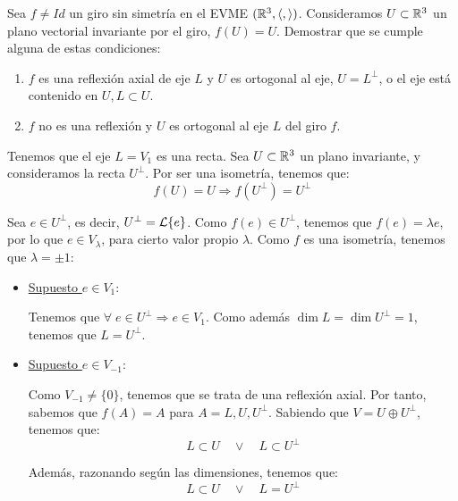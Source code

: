 \begin{ejercicio}
    Sea $f\neq Id$ un giro sin simetría en el EVME $(\mathbb{R}^3, \langle,\rangle)$. Consideramos $U\subset \mathbb{R}^3$ un plano vectorial invariante por el giro, $f(U) = U$. Demostrar que se cumple alguna de estas condiciones:
    \begin{enumerate}
        \item $f$ es una reflexión axial de eje $L$ y $U$ es ortogonal al eje, $U = L^\perp$, o el eje está contenido en $U, L \subset U$.

        \item $f$ no es una reflexión y $U$ es ortogonal al eje $L$ del giro $f$.
    \end{enumerate}


    Tenemos que el eje $L=V_1$ es una recta. Sea $U\subset \mathbb{R}^3$ un plano invariante, y consideramos la recta $U^\perp$. Por ser una isometría, tenemos que:
    \begin{equation*}
        f(U)=U\Longrightarrow f(U^\perp) = U^\perp
    \end{equation*}

    Sea $e\in U^\perp$, es decir, $U^\perp=\mathcal{L}\{e\}$. Como $f(e)\in U^\perp$, tenemos que $f(e)=\lambda e$, por lo que $e\in V_\lambda$, para cierto valor propio $\lambda$. Como $f$ es una isometría, tenemos que $\lambda = \pm 1$:

    \begin{itemize}
        \item \underline{Supuesto $e\in V_1$}:

        Tenemos que $\forall\; e \in U^\perp \Longrightarrow e\in V_1$. Como además $\dim L = \dim U^\perp = 1$, tenemos que $L=U^\perp$.

        \item \underline{Supuesto $e\in V_{-1}$}:

        Como $V_{-1}\neq \{0\}$, tenemos que se trata de una reflexión axial. Por tanto, sabemos que $f(A)=A$ para $A=L,U,U^\perp$. Sabiendo que $V=U\oplus U^\perp$, tenemos que:
        \begin{equation*}
            L\subset U\quad \lor \quad L\subset U^\perp
        \end{equation*}

        Además, razonando según las dimensiones, tenemos que:
        \begin{equation*}
            L\subset U\quad \lor \quad L= U^\perp
        \end{equation*}
    \end{itemize}

\end{ejercicio}

